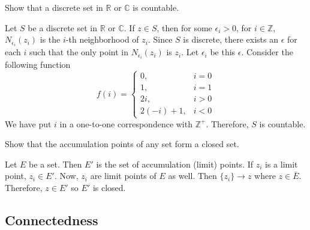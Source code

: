 \begin{exercise}[ref = \arabic{exercisei}]
  Show that a discrete set in \(\mathbb{R}\) or \(\mathbb{C}\) is countable.
  \par\smallskip
  Let \(S\) be a discrete set in \(\mathbb{R}\) or \(\mathbb{C}\).
  If \(z\in S\), then for some \(\epsilon_i > 0\), for \(i\in\mathbb{Z}\),
  \(N_{\epsilon_i}(z_i)\) is the \(i\)-th neighborhood of \(z_i\).
  Since \(S\) is discrete, there exists an \(\epsilon\) for each \(i\) such
  that the only point in \(N_{\epsilon_i}(z_i)\) is \(z_i\).
  Let \(\epsilon_i\) be this \(\epsilon\). 
  Consider the following function
  \[
  f(i) =
  \begin{cases}
    0, & i = 0\\
    1, & i = 1\\
    2i, & i > 0\\
    2(-i) + 1, & i < 0
  \end{cases}
  \]
  We have put \(i\) in a one-to-one correspondence with \(\mathbb{Z}^+\).
  Therefore, \(S\) is countable.
\item
  Show that the accumulation points of any set form a closed set.
  \par\smallskip
  Let \(E\) be a set.
  Then \(E'\) is the set of accumulation (limit) points.
  If \(z_i\) is a limit point, \(z_i\in E'\).
  Now, \(z_i\) are limit points of \(E\) as well.
  Then \(\{z_i\}\to z\) where \(z\in\bar{E}\).
  Therefore, \(z\in E'\) so \(E'\) is closed.
\end{exercise}

\subsection{Connectedness}

